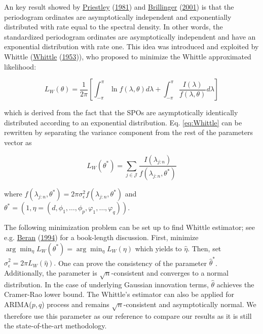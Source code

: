 \documentclass[
  11pt,
]{article}
\begin{document}
An key result showed by
\protect\hyperlink{ref-priestley1981spectral}{Priestley}
(\protect\hyperlink{ref-priestley1981spectral}{1981}) and
\protect\hyperlink{ref-brillinger2001time}{Brillinger}
(\protect\hyperlink{ref-brillinger2001time}{2001}) is that the
periodogram ordinates are asymptotically independent and exponentially
distributed with rate equal to the spectral density. In other words, the
standardized periodogram ordinates are asymptotically independent and
have an exponential distribution with rate one. This idea was introduced
and exploited by Whittle
(\protect\hyperlink{ref-whittle1953estimation}{Whittle}
(\protect\hyperlink{ref-whittle1953estimation}{1953})), who proposed to
minimize the Whittle approximated likelihood:

\begin{equation}
L_{W}(\theta)=\frac{1}{2 \pi}\left[\int_{-\pi}^{\pi} \ln f(\lambda, \theta) d \lambda+\int_{-\pi}^{\pi} \frac{I(\lambda)}{f(\lambda, \theta)} d \lambda\right]
\label{eq:Whittle}
\end{equation}

which is derived from the fact that the SPOs are asymptotically
identically distributed according to an exponential distribution. Eq.
\ref{eq:Whittle} can be rewritten by separating the variance component
from the rest of the parameters vector as

\begin{equation}
L_{W}\left(\theta^{*}\right)=\sum_{j \in \mathcal{J}} \frac{I\left(\lambda_{j: n}\right)}{f\left(\lambda_{j: n}, \theta^{*}\right)}
\end{equation}

where
\(f\left(\lambda_{j: n}, \theta^{*}\right)=2 \pi \sigma_{\epsilon}^{2} f\left(\lambda_{j: n}, \theta^{*}\right)\)
and
\(\theta^{*}=(1, \eta = \left(d, \phi_{1}, \ldots, \phi_{p}, \varphi_{1}, \ldots, \varphi_{q}\right))\).

The following minimization problem can be set up to find Whittle
estimator; see e.g. \protect\hyperlink{ref-beran1994statistics}{Beran}
(\protect\hyperlink{ref-beran1994statistics}{1994}) for a book-length
discussion. First, minimize
\(\arg \min _{\eta} L_{W}\left(\theta^{*}\right)=\arg \min _{\eta} L_{W}(\eta)\)
which yields to \(\hat{\eta}\). Then, set
\(\hat{\sigma}_{\epsilon}^{2}=2 \pi L_{W}(\hat{\eta}).\) One can prove
the consistency of the parameter \(\hat \theta^*\). Additionally, the
parameter is \(\sqrt{n}\)-consistent and converges to a normal
distribution. In the case of underlying Gaussian innovation terms,
\(\hat \theta\) achieves the Cramer-Rao lower bound. The Whittle's
estimator can also be applied for ARIMA(\(p,q\)) process and remains
\(\sqrt{n}\)-consistent and asymptotically normal. We therefore use this
parameter as our reference to compare our results as it is still the
state-of-the-art methodology.
\end{document}
